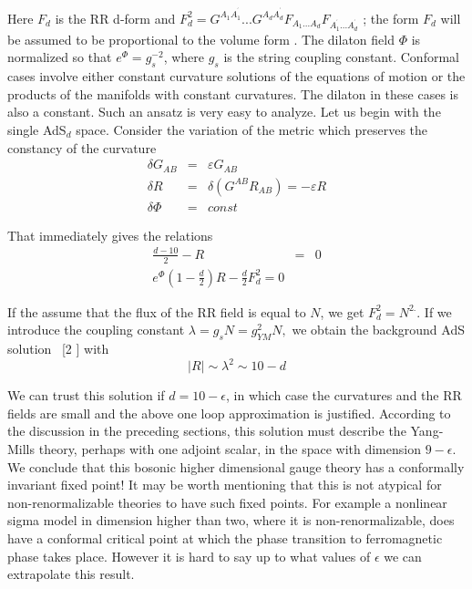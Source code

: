 \documentclass[a4paper,12pt]{article}
\begin{document}
Here $F_{d}$ is the RR d-form and $F_{d}^{2}=G^{A_{1}A_{1}^{^{\prime
}}}...G^{A_{d}A_{d}^{^{\prime }}}F_{A_{1}...A_{d}}F_{A_{1}^{^{\prime
}}...A_{d}^{^{\prime }}}$ ; the form $F_{d}$ will be assumed to be
proportional to the volume form . The dilaton field $\Phi $ is normalized so
that $e^{\Phi }=g_{s}^{-2}$, where $g_{s}$ is the string coupling constant.
Conformal cases involve either constant curvature solutions of the equations
of motion or the products of the manifolds with constant curvatures. The
dilaton in these cases is also a constant. Such an ansatz is very easy to
analyze. Let us begin with the single AdS$_{d}$ space. Consider the
variation of the metric which preserves the constancy of the curvature 
\begin{eqnarray}
\delta G_{AB} &=&\varepsilon G_{AB} \\
\delta R &=&\delta (G^{AB}R_{AB})=-\varepsilon R \\
\delta \Phi  &=&const
\end{eqnarray}

That immediately gives the relations 
\begin{eqnarray}
\frac{d-10}{2}-R &=&0 \\
e^{\Phi }(1-\frac{d}{2})R-\frac{d}{2}F_{d}^{2}=0 &&
\end{eqnarray}

If the assume that the flux of the RR field is equal to $N$, we get $%
F_{d}^{2}=N^{2.}$. If we introduce the coupling constant $\lambda
=g_{s}N=g_{YM}^{2}N,$ we obtain the background AdS solution \ [2 ] with 
\begin{equation}
\mid R\mid \sim \lambda ^{2}\sim 10-d
\end{equation}

We can trust this solution if $d=10-\epsilon $, in which case the curvatures
and the RR fields are small and the above one loop approximation is
justified. According to the discussion in the preceding sections, this
solution must describe the Yang-Mills theory, perhaps with one adjoint
scalar, in the space with dimension $9-\epsilon .$ We conclude that this
bosonic higher dimensional gauge theory has a conformally invariant fixed
point! It may be worth mentioning that this is not atypical for
non-renormalizable theories to have such fixed points. For example a
nonlinear sigma model in dimension higher than two, where it is
non-renormalizable, does have a conformal critical point at which the phase
transition to ferromagnetic phase takes place. However it is hard to say up
to what values of $\epsilon $ we can extrapolate this result.
\end{document}
